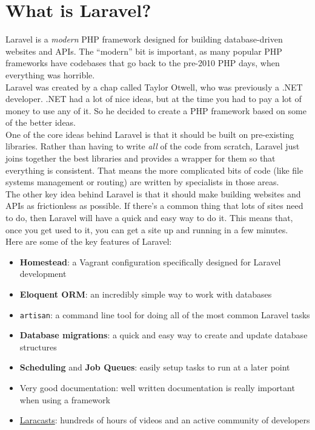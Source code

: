 \section{What is Laravel?}

Laravel is a \textit{modern} PHP framework designed for building database-driven websites and APIs. The ``modern'' bit is important, as many popular PHP frameworks have codebases that go back to the pre-2010 PHP days, when everything was horrible.
\\

Laravel was created by a chap called Taylor Otwell, who was previously a .NET developer. .NET had a lot of nice ideas, but at the time you had to pay a lot of money to use any of it. So he decided to create a PHP framework based on some of the better ideas.
\\

One of the core ideas behind Laravel is that it should be built on pre-existing libraries. Rather than having to write \textit{all} of the code from scratch, Laravel just joins together the best libraries and provides a wrapper for them so that everything is consistent. That means the more complicated bits of code (like file systems management or routing) are written by specialists in those areas.
\\

The other key idea behind Laravel is that it should make building websites and APIs as frictionless as possible. If there's a common thing that lots of sites need to do, then Laravel will have a quick and easy way to do it. This means that, once you get used to it, you can get a site up and running in a few minutes.
\\

Here are some of the key features of Laravel:

\begin{itemize}
    \item \textbf{Homestead}: a Vagrant configuration specifically designed for Laravel development
    \item \textbf{Eloquent ORM}: an incredibly simple way to work with databases
    \item \texttt{artisan}: a command line tool for doing all of the most common Laravel tasks
    \item \textbf{Database migrations}: a quick and easy way to create and update database structures
    \item \textbf{Scheduling} and \textbf{Job Queues}: easily setup tasks to run at a later point
    \item Very good documentation: well written documentation is really important when using a framework
    \item \href{https://laracasts.com}{Laracasts}: hundreds of hours of videos and an active community of developers
\end{itemize}


